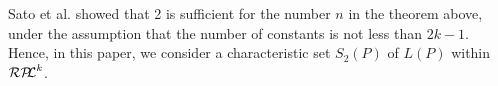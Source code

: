 Sato et al.\cite{Sato1} showed that 2 is sufficient for the number $n$ in the theorem above, under the assumption that the number of constants is not less than $2k-1$.
Hence, in this paper, we consider a characteristic set $S_2(P)$ of $L(P)$ within $\mathcal{RP\!\!L}^{k}$. 
%


